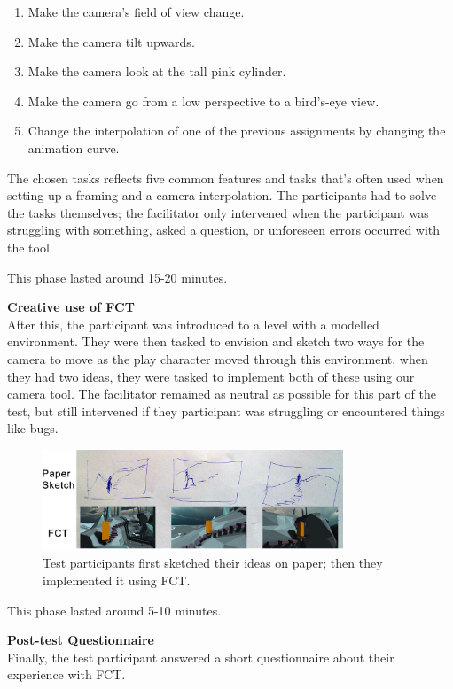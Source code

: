 \begin{enumerate}
\item Make the camera's field of view change.
\item Make the camera tilt upwards.
\item Make the camera look at the tall pink cylinder.
\item Make the camera go from a low perspective to a bird's-eye view.
\item Change the interpolation of one of the previous assignments by changing the animation curve.
\end{enumerate} 

The chosen tasks reflects five common features and tasks that's often used when setting up a framing and a camera interpolation. The participants had to solve the tasks themselves; the facilitator only intervened when the participant was struggling with something, asked a question, or unforeseen errors occurred with the tool.

This phase lasted around 15-20 minutes.

\textbf{Creative use of FCT}\\
After this, the participant was introduced to a level with a modelled environment. They were then tasked to envision and sketch two ways for the camera to move as the play character moved through this environment, when they had two ideas, they were tasked to implement both of these using our camera tool. The facilitator remained as neutral as possible for this part of the test, but still intervened if they participant was struggling or encountered things like bugs.



\begin{figure}[htbp]
\centering
\includegraphics[width=0.8\textwidth]{Pics/Sketching_Framings}
\caption{Test participants first sketched their ideas on paper; then they implemented it using FCT.}
\label{fig:Sketching_Framings}
\end{figure}

This phase lasted around 5-10 minutes.

\textbf{Post-test Questionnaire}\\
Finally, the test participant answered a short questionnaire about their experience with FCT.